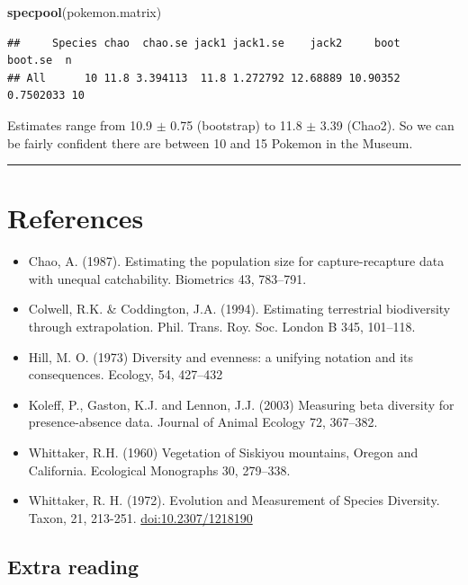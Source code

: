 \documentclass[]{book}
\newenvironment{Shaded}{\begin{snugshade}}{\end{snugshade}}
\newcommand{\KeywordTok}[1]{\textcolor[rgb]{0.13,0.29,0.53}{\textbf{{#1}}}}
\newcommand{\NormalTok}[1]{{#1}}
\providecommand{\tightlist}{%
  \setlength{\itemsep}{0pt}\setlength{\parskip}{0pt}}
\theoremstyle{definition}
\theoremstyle{definition}
\theoremstyle{definition}
\theoremstyle{remark}
\begin{document}
\begin{Shaded}
\begin{Highlighting}[]
\KeywordTok{specpool}\NormalTok{(pokemon.matrix)}
\end{Highlighting}
\end{Shaded}

\begin{verbatim}
##     Species chao  chao.se jack1 jack1.se    jack2     boot   boot.se  n
## All      10 11.8 3.394113  11.8 1.272792 12.68889 10.90352 0.7502033 10
\end{verbatim}

Estimates range from 10.9 \(\pm\) 0.75 (bootstrap) to 11.8 \(\pm\) 3.39
(Chao2). So we can be fairly confident there are between 10 and 15
Pokemon in the Museum.

\begin{center}\rule{0.5\linewidth}{\linethickness}\end{center}

\section{References}\label{references}

\begin{itemize}
\tightlist
\item
  Chao, A. (1987). Estimating the population size for capture-recapture
  data with unequal catchability. Biometrics 43, 783--791.
\item
  Colwell, R.K. \& Coddington, J.A. (1994). Estimating terrestrial
  biodiversity through extrapolation. Phil. Trans. Roy. Soc. London B
  345, 101--118.
\item
  Hill, M. O. (1973) Diversity and evenness: a unifying notation and its
  consequences. Ecology, 54, 427--432
\item
  Koleff, P., Gaston, K.J. and Lennon, J.J. (2003) Measuring beta
  diversity for presence-absence data. Journal of Animal Ecology 72,
  367--382.
\item
  Whittaker, R.H. (1960) Vegetation of Siskiyou mountains, Oregon and
  California. Ecological Monographs 30, 279--338.
\item
  Whittaker, R. H. (1972). Evolution and Measurement of Species
  Diversity. Taxon, 21, 213-251. \url{doi:10.2307/1218190}
\end{itemize}

\subsection{Extra reading}\label{extra-reading}
\end{document}
